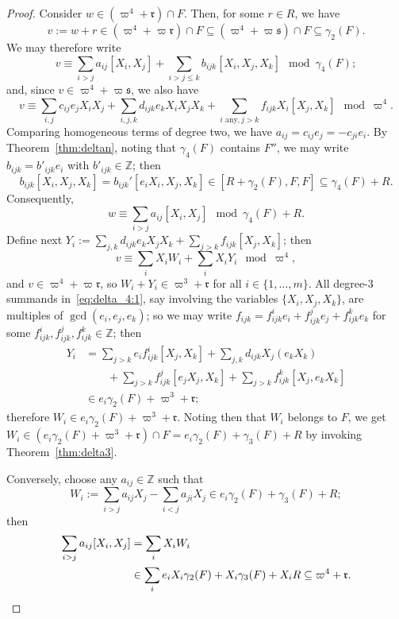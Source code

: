 \documentclass[a4paper,reqno,notitlepage]{amsart}
\theoremstyle{definition}
\newcommand{\Z}{\mathbb Z}
\newcommand\rr{{\mathfrak r}}
\renewcommand\ss{{\mathfrak s}}
\begin{document}
\begin{proof}
  Consider $w\in(\varpi^4+\rr)\cap F$. Then, for some $r\in R$, we
  have
  \[v:=w+r\in(\varpi^4+\varpi\rr)\cap F\subseteq 
  (\varpi^4+\varpi\ss)\cap F\subseteq\gamma_2(F).
  \]
  We may therefore write
  \begin{equation}\label{eq:delta_4:1}
    v\equiv\sum_{i>j} a_{ij}[X_i,X_j]+\sum_{i>j\le k}b_{ijk}[X_i,X_j,X_k]\mod \gamma_4(F);
  \end{equation}
  and, since $v\in\varpi^4+\varpi\ss$, we also have
  \[v\equiv\sum_{i,j}c_{ij}e_jX_iX_j+\sum_{i,j,k}d_{ijk}e_kX_iX_jX_k+\sum_{i\text{ any},j>k}f_{ijk}X_i[X_j,X_k]\mod \varpi^4.
  \]
  Comparing homogeneous terms of degree two, we have
  $a_{ij}=c_{ij}e_j=-c_{ji}e_i$. By Theorem~\ref{thm:deltan}, noting
  that $\gamma_4(F)$ contains $F''$, we may write
  $b_{ijk}=b'_{ijk}e_i$ with $b'_{ijk}\in\Z$; then
  \[b_{ijk}[X_i,X_j,X_k]=b_{ijk}'[e_iX_i,X_j,X_k]\in[R+\gamma_2(F),F,F]\subseteq\gamma_4(F)+R.
  \]
  Consequently,
  \[w\equiv\sum_{i>j}a_{ij}[X_i,X_j]\mod\gamma_4(F)+R.
  \]
  Define next $Y_i:=\sum_{j,k}d_{ijk}e_kX_jX_k+\sum_{j>k}f_{ijk}[X_j,X_k]$; then
  \[v\equiv\sum_iX_iW_i+\sum_iX_iY_i\mod\varpi^4,
  \]
  and $v\in\varpi^4+\varpi\rr$, so $W_i+Y_i\in\varpi^3+\rr$ for all
  $i\in\{1,\dots,m\}$. All degree-$3$ summands
  in~\eqref{eq:delta_4:1}, say involving the variables
  $\{X_i,X_j,X_k\}$, are multiples of $\gcd(e_i,e_j,e_k)$; so we may
  write $f_{ijk}=f_{ijk}^i e_i+f_{ijk}^j e_j+f_{ijk}^k e_k$ for some
  $f_{ijk}^i,f_{ijk}^j,f_{ijk}^k\in\Z$; then
  \begin{align*}
    Y_i &= \sum_{j>k}e_if^i_{ijk}[X_j,X_k]+\sum_{j,k}d_{ijk}X_j(e_kX_k)\\
    &\qquad+\sum_{j>k}f^j_{ijk}[e_jX_j,X_k]+\sum_{j>k}f^k_{ijk}[X_j,e_kX_k]\\
    &\in e_i\gamma_2(F)+\varpi^3+\rr;
  \end{align*}
  therefore $W_i\in e_i\gamma_2(F)+\varpi^3+\rr$. Noting then that
  $W_i$ belongs to $F$, we get
  $W_i\in(e_i\gamma_2(F)+\varpi^3+\rr)\cap
  F=e_i\gamma_2(F)+\gamma_3(F)+R$ by invoking Theorem~\ref{thm:delta3}.

  Conversely, choose any $a_{ij}\in\Z$ such that
  \[W_i:=\sum_{i>j}a_{ij}X_j-\sum_{i<j}a_{ji}X_j\in
  e_i\gamma_2(F)+\gamma_3(F)+R;\] then
  \begin{align*}
    \sum_{i>j}a_{ij}[X_i,X_j]&=\sum_i X_iW_i\\
    &\in\sum_i e_iX_i\gamma_2(F)+X_i\gamma_3(F)+X_iR \subseteq\varpi^4+\rr.\qedhere
  \end{align*}
\end{proof}
\end{document}
